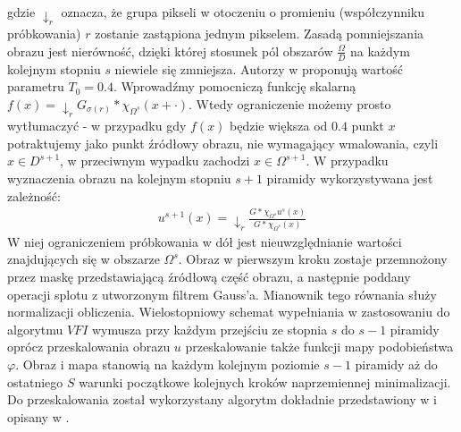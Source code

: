 \documentclass[12pt, twoside, openany]{report}
\theoremstyle{definition}
\begin{document}
gdzie $\downarrow_r$ oznacza, że grupa pikseli w otoczeniu o promieniu (współczynniku próbkowania) $r$ zostanie zastąpiona jednym pikselem. Zasadą pomniejszania obrazu jest nierówność, dzięki której stosunek pól obszarów $\frac{\Omega}{D}$ na każdym kolejnym stopniu $s$ niewiele się zmniejsza. Autorzy w \cite{arias2011variational} proponują wartość parametru $T_0=0.4$. Wprowadźmy pomocniczą funkcję skalarną $f(x) = \downarrow_r G_{\sigma(r)}\ast\chi_{\Omega^s}(x + \cdot)$. Wtedy ograniczenie możemy prosto wytłumaczyć - w przypadku gdy $f(x)$ będzie większa od $0.4$ punkt $x$ potraktujemy jako punkt źródłowy obrazu, nie wymagający wmalowania, czyli $x \in D^{s+1}$, w przeciwnym wypadku zachodzi $x \in \Omega^{s+1}.$ W przypadku wyznaczenia obrazu na kolejnym stopniu $s+1$ piramidy wykorzystywana jest zależność:
\begin{align}
u^{s+1}(x)= \downarrow_r \frac{G \ast \chi_{\Omega^s} u^s(x)}{G \ast \chi_{\Omega^s}(x)}
\end{align}
W niej ograniczeniem próbkowania w dół jest nieuwzględnianie wartości znajdujących się w obszarze $\Omega^s$. Obraz w pierwszym kroku zostaje przemnożony przez maskę przedstawiającą źródłową część obrazu, a następnie poddany operacji splotu z utworzonym filtrem Gauss'a. Mianownik tego równania służy normalizacji obliczenia. Wielostopniowy schemat wypełniania w zastosowaniu do algorytmu $VFI$ wymusza przy każdym przejściu ze stopnia $s$ do $s-1$ piramidy oprócz przeskalowania obrazu $u$ przeskalowanie także funkcji mapy podobieństwa $\varphi$. Obraz i mapa stanowią na każdym kolejnym poziomie $s-1$ piramidy aż do ostatniego $S$ warunki początkowe kolejnych kroków naprzemiennej minimalizacji. Do przeskalowania  został wykorzystany algorytm dokładnie przedstawiony w \cite{wexler2007space} i opisany w \cite{arias2011variational}.
\end{document}
